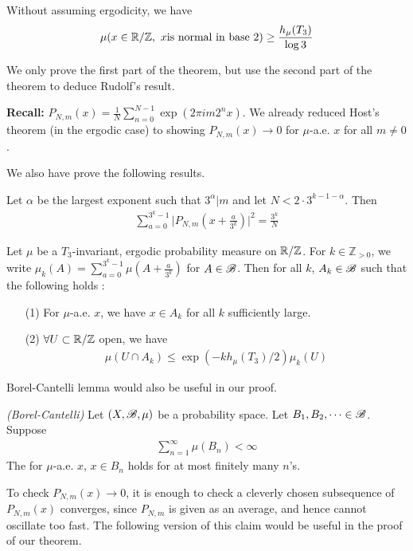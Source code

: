 \documentclass[12pt,a4paper]{report}
\begin{document}
\quad Without assuming ergodicity, we have
\begin{align*}
\mu(x \in \mathbb{R}/\mathbb{Z},\,\, x \text{is normal in base 2})\geq \frac{h_{\mu}(T_3)}{\log 3}
\end{align*}
\s

We only prove the first part of the theorem, but use the second part of the theorem to deduce Rudolf's result.
\s

\textbf{Recall: } $P_{N,m}(x) = \frac{1}{N}\sum_{n=0}^{N-1} \exp(2\pi i m2^n x)$. We already reduced Host's theorem (in the ergodic case) to showing $P_{N,m}(x) \rightarrow 0$ for $\mu$-a.e. $x$ for all $m\neq 0$.

\quad We also have prove the following results.
\s

 Let $\alpha$ be the largest exponent such that $3^{\alpha} | m$ and let $N< 2\cdot 3^{k-1-\alpha}$. Then
\begin{align*}
\sum_{a=0}^{3^k -1} \Big| P_{N,m}(x+ \frac{a}{3^k}) \Big|^2 = \frac{3^k}{N}
\end{align*}
\s

\cor Let $\mu$ be a $T_3$-invariant, ergodic probability measure on $\mathbb{R}/\mathbb{Z}$. For $k \in \mathbb{Z}_{>0}$, we write $\mu_k(A) = \sum_{a=0}^{3^k-1} \mu(A + \frac{a}{3^k})$ for $A \in \mathscr{B}$. Then for all $k$, $A_k \in \mathscr{B}$ such that the following holds :
\begin{itemize}
\item[(1)] For $\mu$-a.e. $x$, we have $x\in A_k$ for all $k$ sufficiently large.
\item[(2)] $\forall U \subset \mathbb{R}/ \mathbb{Z}$ open, we have
\begin{align*}
\mu(U \cap A_k) \leq \exp(-k h_{\mu}(T_3)/2) \mu_k(U)
\end{align*}
\end{itemize}
\s

Borel-Cantelli lemma would also be useful in our proof.
\s

\lem \emph{(Borel-Cantelli)} Let $(X, \mathscr{B}, \mu)$ be a probability space. Let $B_1, B_2, \cdots \in \mathscr{B}$. Suppose 
\begin{align*}
\sum_{n=1}^{\infty} \mu(B_n) < \infty
\end{align*}
The for $\mu$-a.e. $x$, $x\in B_n$ holds for at most finitely many $n$'s.
\s

To check $P_{N,m}(x) \rightarrow 0$, it is enough to check a cleverly chosen subsequence of $P_{N,m}(x)$ converges, since $P_{N,m}$ is given as an average, and hence cannot oscillate too fast. The following version of this claim would be useful in the proof of our theorem.
\s
\end{document}
